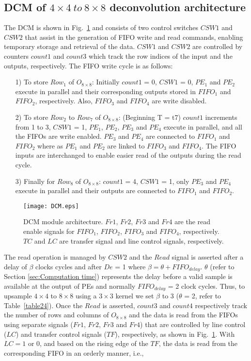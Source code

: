 \documentclass[journal]{IEEEtran}
\begin{document}
\subsection{DCM of $4\times4 \ to \ 8\times8$ deconvolution architecture}\label{sec:Data Control Module (DCM)}
The DCM is shown in Fig.~\ref{fig9} and consists of two control switches $CSW1$ and $CSW2$ that assist in the generation of FIFO write and read commands, enabling temporary storage and retrieval of the data.  $CSW1$ and $CSW2$ are controlled by counters $count1$ and $count3$ which track the row indices of the input and the outputs, respectively. The FIFO write cycle is as follows:
\begin{itemize}[leftmargin=*]
    \item[1)] To store $Row_1$ of $O_{8 \times 8}$: Initially $count1$ = 0, $CSW1$ = 0, $PE_1$ and $PE_2$ execute in parallel and their corresponding outputs stored in $FIFO_1$ and $FIFO_2$, respectively. Also, $FIFO_3$ and $FIFO_4$ are write disabled.
    \item[2)] To store $Row_2$ to $Row_7$ of $O_{8 \times 8}$: (Beginning T = t7) $count1$ increments from 1 to 3, $CSW1$ = 1, $PE_1$, $PE_2$, $PE_3$ and $PE_4$ execute in parallel, and all the FIFOs are write enabled. $PE_3$ and $PE_4$ are connected to $FIFO_1$ and $FIFO_2$ where as $PE_1$ and $PE_2$ are linked to $FIFO_3$ and $FIFO_4$. The FIFO inputs are interchanged to enable easier read of the outputs during the read cycle.
    \item[3)] Finally for $Row_8$ of $O_{8 \times 8}$: $count1$ = 4, $CSW1$ = 1, only $PE_3$ and $PE_4$ execute in parallel and their outputs are connected to $FIFO_1$ and $FIFO_2$.
\end{itemize}


\begin{figure}[h]
	\centering
	\texttt{[image: DCM.eps]}
	\caption{DCM module architecture. $Fr1$, $Fr2$, $Fr3$ and $Fr4$ are the read enable signals for $FIFO_1$, $FIFO_2$, $FIFO_3$ and $FIFO_4$, respectively. $TC$ and $LC$ are transfer signal and line control signals, respectively.}
	\label{fig9}
\end{figure}

The read operation is managed by $CSW2$ and the $Read$ signal is asserted after a delay of $\beta$ clocks cycles and after $De$ = 1 where $\beta = \theta + FIFO_{delay}$. $\theta$ (refer to Section \ref{sec:Computation time}) represents the delay before a valid sample is available at the output of PEs and normally $FIFO_{delay}$ = 2 clock cycles. Thus, to upsample $4 \times 4$ to $8 \times 8$ using a  $3 \times 3$ kernel we set  $\beta$  to 3 ($\theta$ = 2, refer to Table~\ref{table24}). Once the $Read$ is asserted,  $count3$ and $count4$ respectively track the number of rows and columns  of $O_{8 \times 8}$ and the data is read from the FIFOs using separate signals ($Fr1$, $Fr2$, $Fr3$ and $Fr4$) that are controlled by line control ($LC$) and transfer control signals ($TF$), respectively, as shown in Fig.~\ref{fig9}. With $LC = 1$ or $0$, and based on the rising edge of the $TF$, the data is read from the corresponding FIFO in an orderly manner, i.e.,
\end{document}

